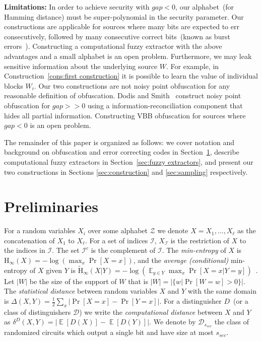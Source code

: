\documentclass[11pt]{article}
\newcommand{\secref}[1]{\mbox{Section~\ref{#1}}}
\newcommand{\consref}[1]{\mbox{Construction~\ref{#1}}}
\DeclareMathOperator*{\expe}{\mathbb{E}}
\newcommand{\Hoo}{\mathrm{H}_\infty}
\newcommand{\Hav}{\tilde{\mathrm{H}}_\infty}
\begin{document}
\textbf{Limitations: } In order to achieve security with $gap<0$, our alphabet~(for Hamming distance) must be super-polynomial in the security parameter.  Our constructions are applicable for sources where many bits are expected to err consecutively, followed by many consecutive correct bits~(known as burst errors~\cite{gilbert1960capacity}).  Constructing a computational fuzzy extractor with the above advantages and a small alphabet is an open problem.  Furthermore, we may leak sensitive information about the underlying source $W$.  For example, in \consref{cons:first construction} it is possible to learn the value of individual blocks $W_i$.  Our two constructions are not noisy point obfuscation for any reasonable definition of obfuscation.  Dodis and Smith~\cite{DBLP:conf/stoc/DodisS05} construct noisy point obfuscation for $gap>>0$ using a information-reconciliation component that hides all partial information.  Constructing VBB obfuscation for sources where $gap <0$ is an open problem.

The remainder of this paper is organized as follows: we cover notation and background on obfuscation and error correcting codes in \secref{sec:preliminaries}, describe computational fuzzy extractors in \secref{sec:fuzzy extractors}, and present our two constructions in Sections \ref{sec:construction} and \ref{sec:sampling} respectively.

\section{Preliminaries}
\label{sec:preliminaries}
For a random variables $X_i$ over some alphabet $\mathcal{Z}$ we denote $X = X_1,..., X_\ell$ as the concatenation of $X_1$ to $X_\ell$.  For a set of indices $\mathcal{I}$,  $X_{\mathcal{I}}$ is the restriction of $X$ to the indices in $\mathcal{I}$.  The set $\mathcal{I}^c$ is the complement of $\mathcal{I}$.  The {\em min-entropy} of $X$ is $\Hoo(X) = -\log(\max_x \Pr[X=x])$,
and the {\em average (conditional)} min-entropy of $X$ given $Y$ is  $\Hav(X|Y) = -\log(\expe_{y\in Y} \max_{x} \Pr[X=x|Y=y])$~\cite[Section 2.4]{DBLP:journals/siamcomp/DodisORS08}.   Let $|W|$ be the size of the support of $W$ that is $|W| = |\{w | \Pr[W=w]>0\}|$.
The {\em statistical distance} between random variables $X$ and $Y$ with the same domain is $\Delta(X,Y) = \frac12 \sum_x |\Pr[X=x] - \Pr[Y=x]|$.
For a distinguisher $D$~(or a class of distinguishers $\mathcal{D}$) we write the \emph{computational distance} between $X$ and $Y$ as $\delta^D(X,Y) = \left| \expe[D(X)]-\expe[D(Y)]\right |$.  We denote by $\mathcal{D}_{s_{sec}}$ the class of randomized circuits which output a single bit and have size at most $s_{sec}$.
\end{document}

